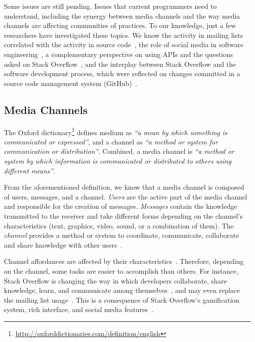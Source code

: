 \documentclass{sig-alternate-05-2015}
\begin{document}
	Some issues are still pending.
	Issues that current programmers need to understand, including the synergy between media channels and the way media channels are affecting communities of practices.
	To our knowledge, just a few researchers have investigated these topics.
	We know the activity in mailing lists correlated with the activity in source code~\cite{Bird2006}, the role of social media in software engineering~\cite{Storey2014, Storey2010}, a complementary perspective on using APIs and the questions asked on Stack Overflow~\cite{Kavaler2013}, and the interplay between Stack Overflow and the software development process, which were reflected on changes committed in a source code management system (GitHub)~\cite{Vasilescu2013a}.

\subsection{Media Channels}

	The Oxford dictionary\footnote{\url{http://oxforddictionaries.com/definition/english}} defines medium as \textit{``a mean by which something is communicated or expressed''}, and a channel as \textit{``a method or system for communication or distribution''}.
	Combined, a media channel is \textit{``a method or system by which information is communicated or distributed to others using different means''}.

	From the aforementioned definition, we know that a media channel is composed of users, messages, and a channel. 
	\textit{Users} are the active part of the media channel and responsible for the creation of messages.
	\textit{Messages} contain the knowledge transmitted to the receiver and take different forms depending on the channel's characteristics (text, graphics, video, sound, or a combination of them).
	The \textit{channel} provides a method or system to coordinate, communicate, collaborate and share knowledge with other users~\cite{Storey2014}.

    Channel affordances are affected by their characteristics~\cite{Storey2014}.
	Therefore, depending on the channel, some tasks are easier to accomplish than others.
	For instance, Stack Overflow is changing the way in which developers collaborate, share knowledge, learn, and communicate among themselves~\cite{Storey2014}, and may even replace the mailing list usage~\cite{Vasilescu2014b}.
	This is a consequence of Stack Overflow's gamification system, rich interface, and social media features~\cite{Vasilescu2014b}.
\end{document}
